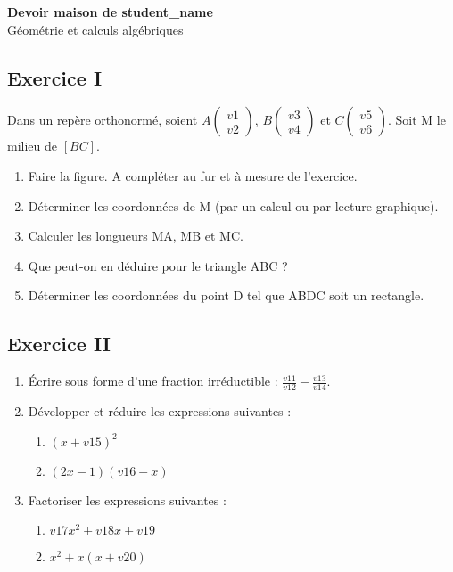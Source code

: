 \documentclass{article}%
\date{}%
\author{}%
\begin{document}
%
\normalsize%
\begin{center}
    {\Large\textbf{Devoir maison de {student_name}}}\\
    Géométrie et calculs algébriques
\end{center}

\subsection*{Exercice I}
Dans un repère orthonormé, soient $A\begin{pmatrix}{v1} \\ {v2}\end{pmatrix}$, $B\begin{pmatrix}{v3} \\ {v4}\end{pmatrix}$ et $C\begin{pmatrix}{v5} \\ {v6}\end{pmatrix}$. Soit M le milieu de $[BC]$.

\begin{enumerate}
\item Faire la figure. A compléter au fur et à mesure de l'exercice.
\item Déterminer les coordonnées de M (par un calcul ou par lecture graphique).
\item Calculer les longueurs MA, MB et MC.
\item Que peut-on en déduire pour le triangle ABC ?
\item Déterminer les coordonnées du point D tel que ABDC soit un rectangle.
\end{enumerate}

\subsection*{Exercice II}
\begin{enumerate}
\item Écrire sous forme d'une fraction irréductible : $\frac{{v11}}{{v12}}-\frac{{v13}}{{v14}}$.
\item Développer et réduire les expressions suivantes :
    \begin{enumerate}
    \item $(x+{v15})^2$
    \item $(2x-1)({v16}-x)$
    \end{enumerate}
\item Factoriser les expressions suivantes :
    \begin{enumerate}
    \item ${v17}x^2+{v18}x+{v19}$
    \item $x^2+x(x+{v20})$
    \end{enumerate}
\end{enumerate}
\end{document}
